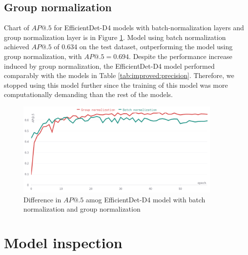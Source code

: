 \subsection{Group normalization}
Chart of $AP@.5$ for EfficientDet-D4 models with batch-normalization layers and group normalization layer is in Figure \ref{fig:batch_group_diff}. Model using batch normalization achieved $AP@.5$ of 0.634 on the test dataset, outperforming the model using group normalization, with $AP@.5=0.694$. Despite the performance increase induced by group normalization, the EfficientDet-D4 model performed comparably with the models in Table \ref{tab:improved:precision}. Therefore, we stopped using this model further since the training of this model was more computationally demanding than the rest of the models.
\begin{figure}[H]
    \centering
    \includegraphics[width=0.9\textwidth]{images/group_norm_batch_norm.png}
    \caption{Difference in $AP@.5$ amog EfficientDet-D4 model with batch normalization and group normalization}
    \label{fig:batch_group_diff}
\end{figure}

\section{Model inspection}
\label{sec:model_inspection_results}
